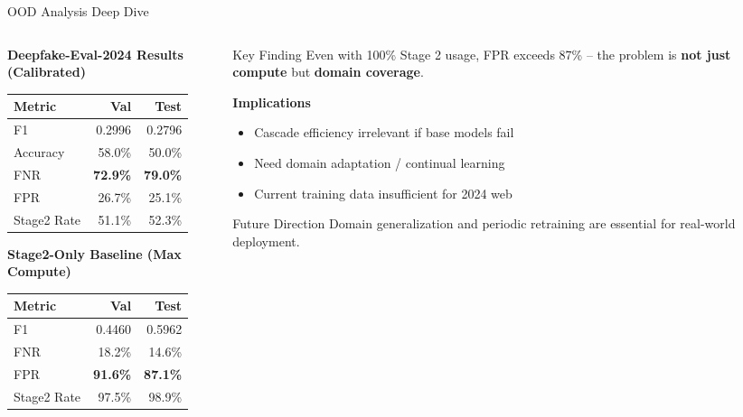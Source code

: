 \documentclass[aspectratio=169,12pt]{beamer}
\newcommand{\highlight}[1]{\textcolor{primaryblue}{\textbf{#1}}}
\newcommand{\alerttext}[1]{\textcolor{alertred}{\textbf{#1}}}
\begin{document}
\begin{frame}{OOD Analysis Deep Dive}
\begin{columns}[T]
\begin{column}{0.55\textwidth}
\textbf{Deepfake-Eval-2024 Results (Calibrated)}
\begin{center}
\scriptsize
\begin{tabular}{lrr}
\toprule
\textbf{Metric} & \textbf{Val} & \textbf{Test} \\
\midrule
F1 & 0.2996 & 0.2796 \\
Accuracy & 58.0\% & 50.0\% \\
FNR & \alerttext{72.9\%} & \alerttext{79.0\%} \\
FPR & 26.7\% & 25.1\% \\
Stage2 Rate & 51.1\% & 52.3\% \\
\bottomrule
\end{tabular}
\end{center}

\vspace{0.3em}
\textbf{Stage2-Only Baseline (Max Compute)}
\begin{center}
\scriptsize
\begin{tabular}{lrr}
\toprule
\textbf{Metric} & \textbf{Val} & \textbf{Test} \\
\midrule
F1 & 0.4460 & 0.5962 \\
FNR & 18.2\% & 14.6\% \\
FPR & \alerttext{91.6\%} & \alerttext{87.1\%} \\
Stage2 Rate & 97.5\% & 98.9\% \\
\bottomrule
\end{tabular}
\end{center}
\end{column}

\begin{column}{0.45\textwidth}
\begin{alertblock}{Key Finding}
Even with 100\% Stage 2 usage, FPR exceeds 87\% -- the problem is \alerttext{not just compute} but \highlight{domain coverage}.
\end{alertblock}

\vspace{0.3em}
\textbf{Implications}
\begin{itemize}
\setlength\itemsep{0.1em}
    \item Cascade efficiency irrelevant if base models fail
    \item Need domain adaptation / continual learning
    \item Current training data insufficient for 2024 web
\end{itemize}

\vspace{0.3em}
\begin{block}{Future Direction}
Domain generalization and periodic retraining are essential for real-world deployment.
\end{block}
\end{column}
\end{columns}
\end{frame}
\end{document}
